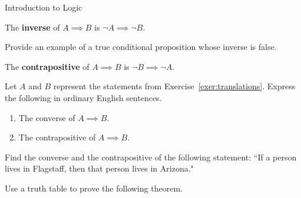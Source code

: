 \begin{section}{Introduction to Logic}
\begin{definition}\label{def:inverse}
The \textbf{inverse} of $A \implies B$ is $\neg A \implies \neg B$.
\end{definition}

\begin{exercise}
Provide an example of a true conditional proposition whose inverse is false.
\end{exercise}

\begin{definition}
The \textbf{contrapositive} of $A \implies B$ is $\neg B \implies \neg A$.
\end{definition}

\begin{exercise}
Let $A$ and $B$ represent the statements from Exercise~\ref{exer:translations}.  Express the following in ordinary English sentences.
\begin{enumerate}[label=\textrm{(\alph*)}]
\item The converse of $A \implies B$.
\item The contrapositive of $A \implies B$.
\end{enumerate}
\end{exercise}

\begin{exercise}
Find the converse and the contrapositive of the following statement: ``If a person lives in Flagstaff, then that person lives in Arizona."
\end{exercise}


Use a truth table to prove the following theorem.


\end{section}
